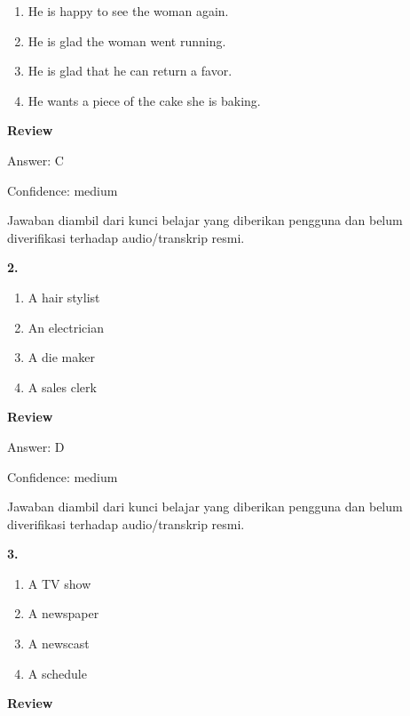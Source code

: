 \documentclass[12pt]{article}
\begin{document}
\begin{enumerate}[label=(\Alph*),leftmargin=*,itemsep=0.2em]
\item He is happy to see the woman again.
\item He is glad the woman went running.
\item He is glad that he can return a favor.
\item He wants a piece of the cake she is baking.
\end{enumerate}
\par
\begingroup
\setlength{\parskip}{0pt}
\setlength{\parindent}{0pt}
\textbf{Review}\par
Answer: C\par
Confidence: medium\par
Jawaban diambil dari kunci belajar yang diberikan pengguna dan belum diverifikasi terhadap audio/transkrip resmi.\par
\endgroup
\par
\vspace{0.25\baselineskip}
\noindent\textbf{2.}
\begin{enumerate}[label=(\Alph*),leftmargin=*,itemsep=0.2em]
\item A hair stylist
\item An electrician
\item A die maker
\item A sales clerk
\end{enumerate}
\par
\begingroup
\setlength{\parskip}{0pt}
\setlength{\parindent}{0pt}
\textbf{Review}\par
Answer: D\par
Confidence: medium\par
Jawaban diambil dari kunci belajar yang diberikan pengguna dan belum diverifikasi terhadap audio/transkrip resmi.\par
\endgroup
\par
\vspace{0.25\baselineskip}
\noindent\textbf{3.}
\begin{enumerate}[label=(\Alph*),leftmargin=*,itemsep=0.2em]
\item A TV show
\item A newspaper
\item A newscast
\item A schedule
\end{enumerate}
\par
\begingroup
\setlength{\parskip}{0pt}
\setlength{\parindent}{0pt}
\textbf{Review}\par
\end{document}
